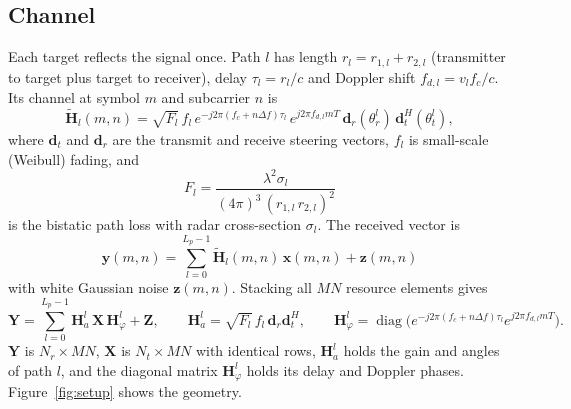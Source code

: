 \documentclass[11pt,a4paper]{article}
\newcommand{\BH}{\mathbf{H}}
\newcommand{\BX}{\mathbf{X}}
\newcommand{\BY}{\mathbf{Y}}
\newcommand{\BZ}{\mathbf{Z}}
\begin{document}
\subsection{Channel}
Each target reflects the signal once. Path $l$ has length $r_l=r_{1,l}+r_{2,l}$ (transmitter to target plus target to receiver), delay $\tau_l=r_l/c$ and Doppler shift $f_{d,l}=v_l f_c/c$. Its channel at symbol $m$ and subcarrier $n$ is
\begin{equation}
  \tilde{\BH}_l(m,n)=\sqrt{F_l}\,f_l\,e^{-j2\pi(f_c+n\Delta f)\tau_l}\,e^{j2\pi f_{d,l} m T}\,\mathbf{d}_r(\theta_r^l)\,\mathbf{d}_t^H(\theta_t^l),
\end{equation}
where $\mathbf{d}_t$ and $\mathbf{d}_r$ are the transmit and receive steering vectors, $f_l$ is small-scale (Weibull) fading, and
\begin{equation}
  F_l=\frac{\lambda^2\sigma_l}{(4\pi)^3\,(r_{1,l}\,r_{2,l})^2}
\end{equation}
is the bistatic path loss with radar cross-section $\sigma_l$. The received vector is
\begin{equation}
  \mathbf{y}(m,n)=\sum_{l=0}^{L_p-1}\tilde{\BH}_l(m,n)\,\mathbf{x}(m,n)+\mathbf{z}(m,n)
\end{equation}
with white Gaussian noise $\mathbf{z}(m,n)$. Stacking all $MN$ resource elements gives~\cite[eq.~(9)]{isacnet}
\begin{equation}
  \BY=\sum_{l=0}^{L_p-1}\BH_a^l\,\BX\,\BH_\varphi^l+\BZ,\qquad
  \BH_a^l=\sqrt{F_l}\,f_l\,\mathbf{d}_r\mathbf{d}_t^H,\qquad
  \BH_\varphi^l=\operatorname{diag}\!\big(e^{-j2\pi(f_c+n\Delta f)\tau_l}e^{j2\pi f_{d,l}mT}\big).
\end{equation}
$\BY$ is $N_r\times MN$, $\BX$ is $N_t\times MN$ with identical rows, $\BH_a^l$ holds the gain and angles of path $l$, and the diagonal matrix $\BH_\varphi^l$ holds its delay and Doppler phases.
Figure~\ref{fig:setup} shows the geometry.
\end{document}
